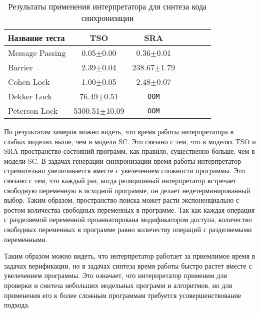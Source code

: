 \begin{table}
\bgroup
\def\arraystretch{2}
\begin{center}
\begin{tabular}{| l | c | c | c | c | c | c |}
  \hline
  Название теста & TSO & SRA                                                    \\ \hline
  Message Passing                       &    0.05$\pm$0.00  &   0.36$\pm$0.01       \\ \hline
  Barrier                               &    2.39$\pm$0.04  & 238.67$\pm$1.79       \\ \hline
  Cohen Lock                            &    1.00$\pm$0.05  &   2.48$\pm$0.07       \\ \hline
  Dekker Lock                           &   76.49$\pm$0.51  & \texttt{OOM}          \\ \hline
  Peterson Lock                         & 5300.51$\pm$10.09 & \texttt{OOM}          \\ \hline
\end{tabular}
\end{center}
\caption{Результаты применения интерпретатора для синтеза кода синхронизации}
\label{tab:synthesis}
\egroup
\end{table}

По результатам замеров можно видеть, что время работы интерпретатора 
в слабых моделях выше, чем в модели SC. 
Это связано с тем, что в моделях TSO и SRA пространство состояний программ, 
как правило, существенно больше, чем в модели SC.
В задачах генерации синхронизации время работы интерпретатор
стремительно увеличивается вместе с увелечением сложности программы.
Это связано с тем, что каждый раз, когда реляционный интерпретатор встречает
свободную переменную в исходной программе, он делает
недетерминированный выбор. 
Таким образом, пространство поиска может
расти экспоненциально с ростом количества свободных переменных в программе.
Так как каждая операция с разделяемой переменной проаннатирована 
модификатором доступа, количество свободных переменных в программе
равно количеству операций с разделяемыми переменными. 

Таким образом можно видеть, что интерпретатор 
работает за приемлимое время в задачах верификации, 
но в задачах синтеза время работы быстро растет вместе с увелечением программы.
Это означает, что интерпретатор применим для проверки и синтеза 
небольших модельных программ и алгоритмов,
но для применения его к более сложным программам требуется
усовершенствование подхода.

